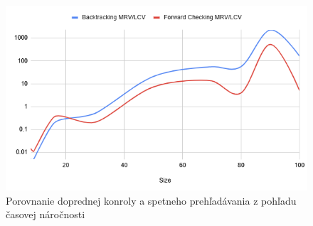 \begin{figure}
    \centering
    \includegraphics[width=1\textwidth]{figs/img_2}
    \caption{Porovnanie doprednej konroly a spetneho prehľadávania z pohľadu časovej náročnosti}
    \label{fig:last}
\end{figure}

